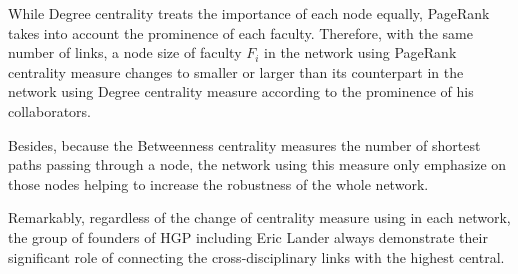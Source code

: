 \documentclass[10pt]{article}         %
\begin{document}
While Degree centrality treats the importance of each node equally, PageRank takes into account the prominence of each faculty. Therefore, with the same number of links, a node size of faculty $F_i$ in the network using PageRank centrality measure changes to smaller or larger than its counterpart in the network using Degree centrality measure according to the prominence of his collaborators.

Besides, because the Betweenness centrality measures the number of shortest paths passing through a node, the network using this measure only emphasize on those nodes helping to increase the robustness of the whole network.

Remarkably, regardless of the change of centrality measure using in each network, the group of founders of HGP including Eric Lander always demonstrate their significant role of connecting the cross-disciplinary links with the highest central.

\newpage
\end{document}
